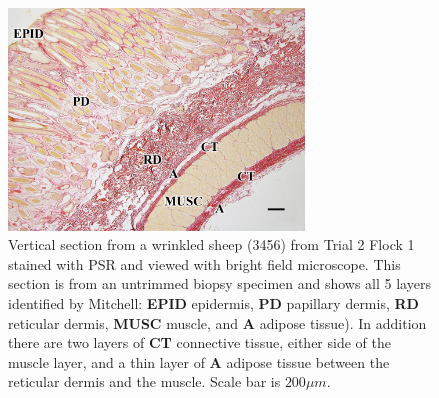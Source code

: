 %

\begin{figure}[!h]
  \centering
  \captionsetup{width=0.7\textwidth}
  \includegraphics[width=0.7\textwidth]{fig4.jpg}
  \caption{Vertical section from a wrinkled sheep (3456) from Trial 2 Flock 1 stained with PSR and viewed with bright field microscope. This section is from an untrimmed biopsy specimen and shows all 5 layers identified by Mitchell: {\bf EPID} epidermis, {\bf PD} papillary dermis, {\bf RD} reticular dermis, {\bf MUSC} muscle, and {\bf A} adipose tissue). In addition there are two layers of {\bf CT} connective tissue, either side of the muscle layer, and a thin layer of {\bf A} adipose tissue between the reticular dermis and the muscle. Scale bar is $200\mu m$.}
  \label{fig:trial2psr}
\end{figure}

%

